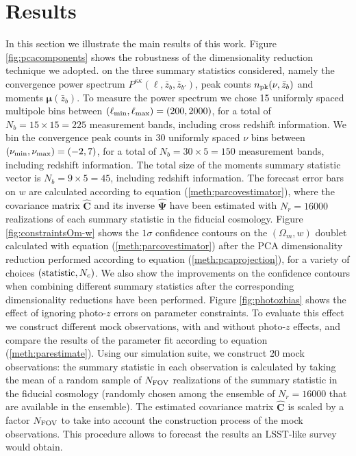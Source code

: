 \documentclass[reprint,aps,prd,superscriptaddress,showkeys,showpacs]{revtex4-1}
\newcommand{\bbh}[1]{\mathbf{\hat{#1}}}
\begin{document}
\section{Results}
In this section we illustrate the main results of this work. Figure \ref{fig:pcacomponents} shows the robustness of the dimensionality reduction technique we adopted. on the three summary statistics considered, namely the convergence power spectrum $P^{\kappa\kappa}(\ell,\bar{z}_b,\bar{z}_{b'})$, peak counts $n_{\rm pk}(\nu,\bar{z}_b)$ and moments $\pmb{\mu}(\bar{z}_b)$. To measure the power spectrum we chose 15 uniformly spaced multipole bins between $(\ell_{\rm min},\ell_{\rm max})=(200,2000)$, for a total of $N_b=15\times 15=225$ measurement bands, including cross redshift information. We bin the convergence peak counts in 30 uniformly spaced $\nu$ bins between $(\nu_{\rm min},\nu_{\rm max})=(-2,7)$, for a total of $N_b=30\times5=150$ measurement bands, including redshift information. The total size of the moments summary statistic vector is $N_b=9\times 5=45$, including redshift information. The forecast error bars on $w$ are calculated according to equation (\ref{meth:parcovestimator}), where the covariance matrix $\bbh{C}$ and its inverse $\bbh{\Psi}$ have been estimated with $N_r=16000$ realizations of each summary statistic in the fiducial cosmology. Figure \ref{fig:constraintsOm-w} shows the $1\sigma$ confidence contours on the $(\Omega_m,w)$ doublet calculated with equation (\ref{meth:parcovestimator}) after the PCA dimensionality reduction performed according to equation (\ref{meth:pcaprojection}), for a variety of choices $({\rm statistic},N_c)$. We also show the improvements on the confidence contours when combining different summary statistics after the corresponding dimensionality reductions have been performed. Figure \ref{fig:photozbias} shows the effect of ignoring photo-$z$ errors on parameter constraints. To evaluate this effect we construct different mock observations, with and without photo-$z$ effects, and compare the results of the parameter fit according to equation (\ref{meth:parestimate}). Using our simulation suite, we construct 20 mock observations: the summary statistic in each observation is calculated by taking the mean of a random sample of $N_{\rm FOV}$ realizations of the summary statistic in the fiducial cosmology (randomly chosen among the ensemble of $N_r=16000$ that are available in the ensemble). The estimated covariance matrix $\bbh{C}$ is scaled by a factor $N_{\rm FOV}$ to take into account the construction process of the mock observations. This procedure allows to forecast the results an LSST-like survey would obtain.        
\end{document}
